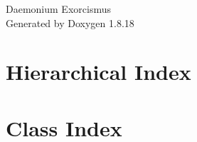 \let\mypdfximage\pdfximage\def\pdfximage{\immediate\mypdfximage}\documentclass[twoside]{book}
\newcommand{\+}{\discretionary{\mbox{\scriptsize$\hookleftarrow$}}{}{}}
\newcommand{\clearemptydoublepage}{%
  \newpage{\pagestyle{empty}\cleardoublepage}%
}
\begin{document}
\hypersetup{pageanchor=false,
             bookmarksnumbered=true,
             pdfencoding=unicode
            }
\begin{titlepage}
\vspace*{7cm}
\begin{center}%
{\Large Daemonium Exorcismus }\\
\vspace*{1cm}
{\large Generated by Doxygen 1.8.18}\\
\end{center}
\end{titlepage}
\clearemptydoublepage
{}
\tableofcontents
\clearemptydoublepage
{}
\hypersetup{pageanchor=true}

\chapter{Hierarchical Index}

\chapter{Class Index}

\end{document}
